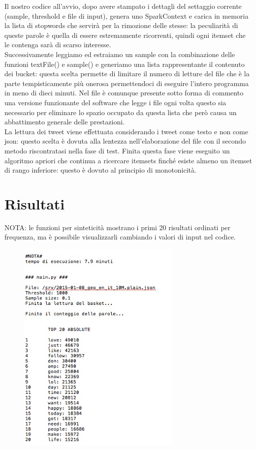 \documentclass{article}
\begin{document}
Il nostro codice all'avvio, dopo avere stampato i dettagli del settaggio corrente (sample, threshold e file di input), genera uno SparkContext e carica in memoria la lista di stopwords che servirà per la rimozione delle stesse: la peculiarità di queste parole è quella di essere estremamente ricorrenti, quindi ogni itemset che le contenga sarà di scarso interesse.\\
Successivamente leggiamo ed estraiamo un sample con la combinazione delle funzioni textFile() e sample() e generiamo una lista rappresentante il contenuto dei bucket: questa scelta permette di limitare il numero di letture del file che è la parte tempisticamente più onerosa permettendoci di eseguire l'intero programma in meno di dieci minuti. Nel file è comunque presente sotto forma di commento una versione funzionante del software che legge i file ogni volta questo sia necessario per eliminare lo spazio occupato da questa lista che però causa un abbattimento generale delle prestazioni.\\
La lettura dei tweet viene effettuata considerando i tweet come testo e non come json: questo scelta è dovuta alla lentezza nell'elaborazione del file con il secondo metodo riscontratasi nella fase di test.
Finita questa fase viene eseguito un algoritmo apriori che continua a ricercare itemsets finché esiste almeno un itemset di rango inferiore: questo è dovuto al principio di monotonicità.
\newpage
\section{Risultati}
NOTA: le funzioni per sinteticità mostrano i primi 20 risultati ordinati per frequenza, ma è possibile visualizzarli cambiando i valori di input nel codice.

\begin{figure}[h]
  \begin{center}
  \includegraphics[width=300px]{1code.jpeg}
  \end{center}
\end{figure}
\end{document}
